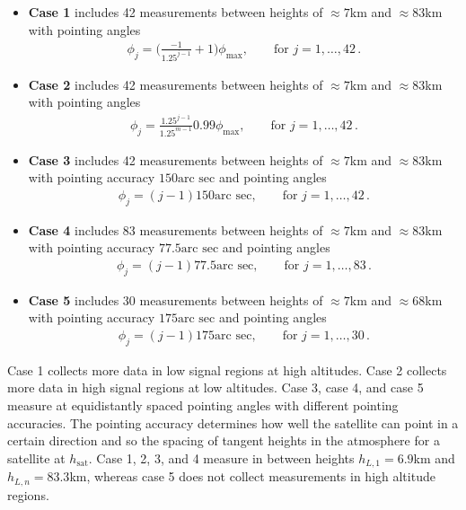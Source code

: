 \begin{itemize}
	\item \textbf{Case 1} includes 42 measurements between heights of $\approx7$km and $\approx83$km with pointing angles
	\begin{align*} 
		\phi_j  = \Bigg(\frac{-1}{1.25^{j-1}} + 1 \Bigg) \phi_{\text{max}} , \qquad  \text{for } j = 1, \dots, 42  \, .
	\end{align*}
	\item \textbf{Case 2} includes 42 measurements between heights of $\approx7$km and $\approx83$km with pointing angles
	\begin{align*} 
		\phi_j  = \frac{1.25 ^{j-1}}{ 1.25 ^{m-1}} 0.99 \phi_{\text{max}},  \qquad  \text{for } j = 1, \dots, 42\, .
	\end{align*}
	\item \textbf{Case 3} includes 42 measurements between heights of $\approx 7$km and $\approx 83$km with pointing accuracy $150 \text{arc sec}$ and pointing angles
	\begin{align*} 
		\phi_j  = (j-1) 150 \text{arc sec} ,  \qquad  \text{for } j = 1, \dots, 42\, .
	\end{align*}
	\item \textbf{Case 4} includes 83 measurements between heights of $\approx 7$km and $\approx83$km with pointing accuracy $77.5 \text{arc sec}$  and pointing angles
	\begin{align*} 
		\phi_j  =   (j-1) 77.5 \text{arc sec} ,  \qquad  \text{for } j = 1, \dots, 83\, .
	\end{align*}
	\item \textbf{Case 5} includes 30 measurements between heights of $\approx 7$km and $\approx 68$km with pointing accuracy $175  \text{arc sec}$ and pointing angles
	\begin{align*} 
		\phi_j  =  (j-1) 175 \text{arc sec} ,  \qquad  \text{for } j = 1, \dots, 30\, .
	\end{align*}
\end{itemize} 
Case 1 collects more data in low signal regions at high altitudes.
Case 2 collects more data in high signal regions at low altitudes.
Case 3, case 4, and case 5 measure at equidistantly spaced pointing angles with different pointing accuracies.
The pointing accuracy determines how well the satellite can point in a certain direction and so the spacing of tangent heights in the atmosphere for a satellite at $h_{\text{sat}}$.
Case 1, 2, 3, and 4 measure in between heights $h_{L,1} = 6.9$km and $h_{L,n} = 83.3$km, whereas case 5 does not collect measurements in high altitude regions.

